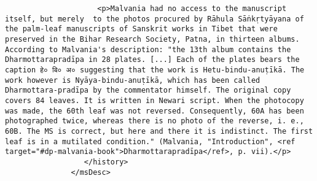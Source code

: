 \documentclass[article,12pt,a4paper]{memoir}
\begin{document}
\begin{verbatim}
                     <p>Malvania had no access to the manuscript itself, but merely  to the photos procured by Rāhula Sāṅkṛtyāyana of the palm-leaf manuscripts of Sanskrit works in Tibet that were preserved in the Bihar Research Society, Patna, in thirteen albums. According to Malvania's description: "the 13th album contains the Dharmottarapradīpa in 28 plates. [...] Each of the plates bears the caption हे० बि० अ० suggesting that the work is Hetu-bindu-anuṭīkā. The work however is Nyāya-bindu-anuṭīkā, which has been called Dharmottara-pradīpa by the commentator himself. The original copy covers 84 leaves. It is written in Newari script. When the photocopy was made, the 60th leaf was not reversed. Consequently, 60A has been photographed twice, whereas there is no photo of the reverse, i. e., 60B. The MS is correct, but here and there it is indistinct. The first leaf is in a mutilated condition." (Malvania, "Introduction", <ref target="#dp-malvania-book">Dharmottarapradīpa</ref>, p. vii).</p>
                  </history>
               </msDesc>


\end{verbatim}
\end{document}
